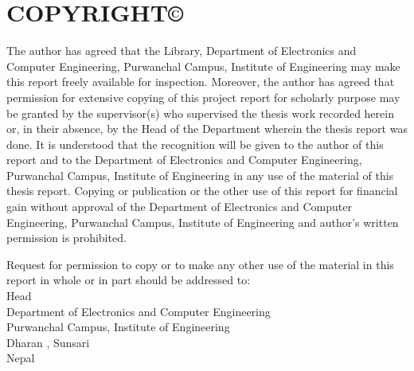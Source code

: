 \setcounter{page}{4}

\chapter*{COPYRIGHT\copyright}\par

The author has agreed that the Library, Department of Electronics and Computer Engineering, Purwanchal Campus, Institute of Engineering may make this report freely
available for inspection. Moreover, the author has agreed that permission for extensive
copying of this project report for scholarly purpose may be granted by the supervisor(s)
who supervised the thesis work recorded herein or, in their absence, by the Head of
the Department wherein the thesis report was done. It is understood that the
recognition will be given to the author of this report and to the Department of
Electronics and Computer Engineering, Purwanchal Campus, Institute of Engineering in
any use of the material of this thesis report. Copying or publication or the other use of
this report for financial gain without approval of the Department of Electronics and
Computer Engineering, Purwanchal Campus, Institute of Engineering and author’s
written permission is prohibited.


Request for permission to copy or to make any other use of the material in this report
in whole or in part should be addressed to:\\

Head\\
Department of Electronics and Computer Engineering\\
Purwanchal Campus, Institute of Engineering\\
Dharan , Sunsari\\
Nepal
